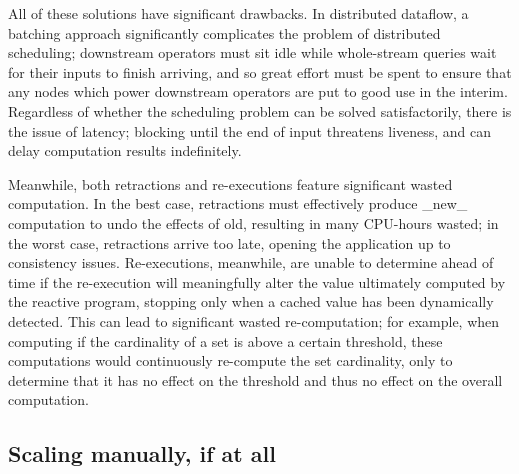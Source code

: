 All of these solutions have significant drawbacks.  In distributed dataflow, a batching approach significantly complicates the problem of distributed scheduling; downstream operators must sit idle while whole-stream queries wait for their inputs to finish arriving, and so great effort must be spent to ensure that any nodes which power downstream operators are put to good use in the interim. Regardless of whether the scheduling problem can be solved satisfactorily, there is the issue of latency; blocking until the end of input threatens liveness, and can delay computation results indefinitely. 

Meanwhile, both retractions and re-executions feature significant wasted computation.  In the best case, retractions must effectively produce _new_ computation to undo the effects of old, resulting in many CPU-hours wasted; in the worst case, retractions arrive too late, opening the application up to consistency issues.  Re-executions, meanwhile, are unable to determine ahead of time if the re-execution will meaningfully alter the value ultimately computed by the reactive program, stopping only when a cached value has been dynamically detected.  This can lead to significant wasted re-computation; for example, when computing if the cardinality of a set is above a certain threshold, these computations would continuously re-compute the set cardinality, only to determine that it has no effect on the threshold and thus no effect on the overall computation. 

\subsection{Scaling manually, if at all}





\endinput
